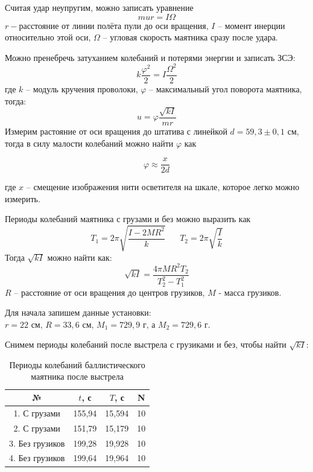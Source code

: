 \documentclass[a4paper,12pt]{article}
\begin{document}
	Считая удар неупругим, можно записать уравнение
	$$mur=I \Omega$$
	$r-$расстояние от линии полёта пули до оси вращения, $I$ -- момент инерции относительно этой оси, $\Omega$ -- угловая скорость маятника сразу после удара.
	
	Можно пренебречь затуханием колебаний и потерями энергии и записать ЗСЭ:
	$$ k \frac{\varphi^2}{2} = I \frac{\Omega^2}{2} $$
	\noindent где $k$ -- модуль кручения проволоки, $\varphi$ -- максимальный угол поворота маятника, тогда:
	\begin{equation} \label{vel2}
		 u = \varphi \frac{\sqrt{kI}}{mr} 
	\end{equation}
	Измерим растояние от оси вращения до штатива с линейкой $d = 59,3 \pm 0,1 \text{ см}$, тогда в силу малости колебаний можно найти $\varphi$ как
	
	\begin{equation}
		\label{phi}
		\varphi \approx \frac{x}{2d}
	\end{equation}
	
	где $x$ -- смещение изображения нити осветителя на шкале, которое легко можно измерить.
	
	Периоды колебаний маятника с грузами и без можно выразить как
	$$T_1= 2 \pi \sqrt{\frac{I - 2MR^2}{k}} \;\;\;\;\;\; T_2 = 2 \pi \sqrt{\frac{I}{k}}$$
	Тогда $\sqrt{kI}$ можно найти как:
	\begin{equation}
		\sqrt{kI} = \frac{4 \pi M R^2 T_2}{T_2^2 - T_1^2}
		\label{kl}
	\end{equation}
	$R$ -- расстояние от оси вращения до центров грузиков, $M$ - масса грузиков.
	
	Для начала запишем данные установки: $ r = 22 \text{ см} \text{, } R = 33,6 \text{ см} \text{, } M_1 = 729,9\text{ г} \text{, а } M_2 = 729,6 \text{ г} $.
	
	Снимем периоды колебаний после выстрела с грузиками и без, чтобы найти $\sqrt{kI}$:
	
	\begin{table}[H]
		\begin{center}
			\begin{tabular}{|c|c|c|c|}
				\hline
				№  & $t$, с  & $T$, с&  N \\
				\hline
				1. С грузами & 155,94& 15,594 & 10\\
				\hline
				2. С грузами & 151,79 & 15,179& 10\\
				\hline
				3. Без грузиков & 199,28 & 19,928& 10\\
				\hline
				4. Без грузиков & 199,64 & 19,964& 10\\
				\hline  
			\end{tabular}
			\caption{Периоды колебаний баллистического маятника после выстрела}
		\end{center}
	\end{table}
\end{document}
